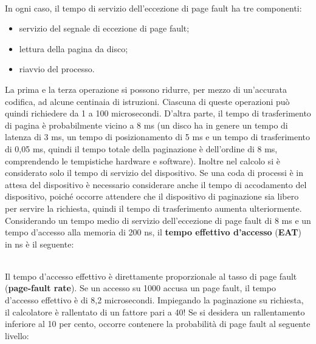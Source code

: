 \documentclass{article}
\begin{document}
				\\In ogni caso, il tempo di servizio dell’eccezione di page fault ha tre componenti:
				\begin{itemize}
					\item servizio del segnale di eccezione di page fault;
					\item lettura della pagina da disco;
					\item riavvio del processo.
				\end{itemize}
				La prima e la terza operazione si possono ridurre, per mezzo di un’accurata codifica, ad alcune centinaia di istruzioni. Ciascuna di queste operazioni può quindi richiedere da 1 a 100 microsecondi. D’altra parte, il tempo di trasferimento di pagina è probabilmente vicino a 8 ms (un disco ha in genere un tempo di latenza di 3 ms, un tempo di posizionamento di 5 ms e un tempo di trasferimento di 0,05 ms, quindi il tempo totale della paginazione è dell’ordine di 8 ms, comprendendo le tempistiche hardware e software). Inoltre nel calcolo si è considerato solo il tempo di servizio del dispositivo. Se una coda di processi è in attesa del dispositivo è necessario considerare anche il tempo di accodamento del dispositivo, poiché occorre attendere che il dispositivo di paginazione sia libero per servire la richiesta, quindi il tempo di trasferimento aumenta ulteriormente.
				\newpage
				\noindent Considerando un tempo medio di servizio dell’eccezione di page fault di 8 ms e un tempo d’accesso alla memoria di 200 ns, il \textbf{tempo effettivo d’accesso} (\textbf{EAT}) in ns è il seguente:
				\begin{figure}[ht!]
				\end{figure}
				\\Il tempo d’accesso effettivo è direttamente proporzionale al tasso di page fault (\textbf{page-fault rate}). Se un accesso su 1000 accusa un page fault, il tempo d’accesso effettivo è di 8,2 microsecondi. Impiegando la paginazione su richiesta, il calcolatore è
				rallentato di un fattore pari a 40! Se si desidera un rallentamento inferiore al 10 per cento, occorre contenere la probabilità di page fault al seguente livello:
				\begin{figure}[ht!]
				\end{figure}
\end{document}

